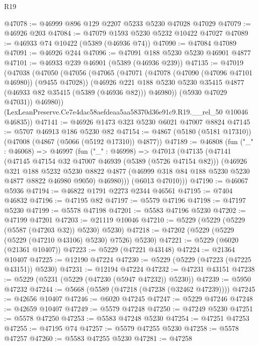 \begin{lexlean}{R19}
\begin{coremodule}
@47078 := @46999 @896 @129 @2207 @5233 @5230 @47028 @47029
@47079 := @46926 @203
@47084 := @47079 @1593 @5230 @5232 @10422 @47027
@47089 := @46933 @74 @10422 (@5389 (@46936 @74))
@47090 := @47084 @47089
@47091 := @46926 @244
@47096 := @47091 @188 @5230 @5230 @46901 @4877
@47101 := @46933 @239 @46901 (@5389 (@46936 @239))
@47135 := @47019
    (@47038
      (@47050
        (@47056
          (@47065
            (@47071
              (@47078 (@47090 (@47096 @47101 @46980)) (@9455 @47028))
              (@46926
                @221
                @188
                @5230
                @5230
                @35415
                @4877
                (@46933 @82 @35415 (@5389 (@46936 @82)))
                @46980))
            (@5930 @47029 @47031))
          @46980))
      (LexLeanPreserve.Ce7e4dac58aefdeaa5aa58370d36e91c9.R19.__rel_50 @10046 @46835))
@47141 := @46926 @1473 @323 @5230 @6021 @47007 @8824
@47145 := @5707 @46913 @186 @5230 @82
@47154 := @4867 (@5180 (@5181 @17310)) (@47008 (@4867 (@5066 (@5192 @17310)) @4877))
@47189 := @46808
    (fun ("_" : @46068) =>
    @46997
      (fun ("_" : @46998) =>
      @47013
        (@47135
          (@47141
            (@47145 @47154 @32 @47007 @46939 (@5389 (@5726 @47154 @82)))
            (@46926
              @321
              @188
              @5232
              @5230
              @8822
              @4877
              (@46999 @318 @84 @188 @5230 @5230 @4877 @8822 @46980 @9050)
              @46980)))
        (@6013 @47010)))
@47190 := @46067 @5936
@47194 := @46822 @1791 @2273 @2344 @46561
@47195 := @7404 @46832
@47196 := @47195 @82
@47197 := @5579 @47196
@47198 := @47197 @5230
@47199 := @5578 @47198
@47201 := @5583 @47196 @5230
@47202 := @47199 @47201
@47203 := @21119 @10046
@47210 := @5229 (@5229 (@5229 (@5587 (@47203 @32)) @5230) @5230)
@47218 := @47202 (@5229 (@5229 (@5229 (@47210 @43106) @5230) @7526) @5230)
@47221 := @5229 (@6020 (@21361 @10407))
@47223 := @5229 (@47221 @43148)
@47224 := @21364 @10407
@47225 := @12190 @47224
@47230 := @5229 (@5229 (@47223 (@47225 @43151)) @5230)
@47231 := @12194 @47224
@47232 := @47231 @43151
@47238 := @5229 (@5231 (@5229 (@47230 (@5947 @47232)) @5230))
@47239 := @5950 @47232
@47244 := @5668 (@5589 (@47218 (@47238 (@32462 @47239))))
@47245 := @42656 @10407
@47246 := @6020 @47245
@47247 := @5229 @47246
@47248 := @42659 @10407
@47249 := @5579 @47248
@47250 := @47249 @5230
@47251 := @5578 @47250
@47253 := @5583 @47248 @5230
@47254 := @47251 @47253
@47255 := @47195 @74
@47257 := @5579 @47255 @5230
@47258 := @5578 @47257
@47260 := @5583 @47255 @5230
@47281 := @47258

\end{coremodule}
\end{lexlean}
